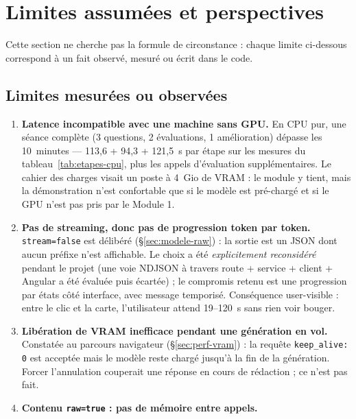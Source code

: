 \section{Limites assumées et perspectives}
\label{sec:limites}

Cette section ne cherche pas la formule de circonstance : chaque limite ci-dessous
correspond à un fait observé, mesuré ou écrit dans le code.

\subsection{Limites mesurées ou observées}

\begin{enumerate}[label=\textbf{L\arabic*.},leftmargin=3.2em,itemsep=4pt]
  \item \textbf{Latence incompatible avec une machine sans GPU.} En CPU pur, une
        séance complète (3 questions, 2 évaluations, 1 amélioration) dépasse les
        10~minutes --- 113,6 + 94,3 + 121,5~s par étape sur les mesures du
        tableau~\ref{tab:etapes-cpu}, plus les appels d'évaluation supplémentaires.
        Le cahier des charges visait un poste à 4~Gio de VRAM : le module y tient,
        mais la démonstration n'est confortable que si le modèle est pré-chargé
        et si le GPU n'est pas pris par le Module 1.
  \item \textbf{Pas de streaming, donc pas de progression token par token.}
        \texttt{stream=false} est délibéré (§\ref{sec:modele-raw}) : la sortie est
        un JSON dont aucun préfixe n'est affichable. Le choix a été
        \emph{explicitement reconsidéré} pendant le projet (une voie NDJSON à
        travers route + service + client + Angular a été évaluée puis écartée) ;
        le compromis retenu est une progression par états côté interface, avec
        message temporisé. Conséquence user-visible : entre le clic et la carte,
        l'utilisateur attend 19--120~s sans rien voir bouger.
        \label{sec:no-stream}
  \item \textbf{Libération de VRAM inefficace pendant une génération en vol.}
        Constatée au parcours navigateur (§\ref{sec:perf-vram}) : la requête
        \texttt{keep\_alive: 0} est acceptée mais le modèle reste chargé
        jusqu'à la fin de la génération. Forcer l'annulation couperait une
        réponse en cours de rédaction ; ce n'est pas fait.
  \item \textbf{Contenu \texttt{raw=true} : pas de mémoire entre appels.}

\end{enumerate}
